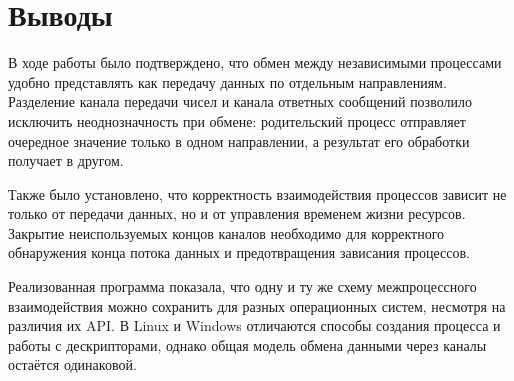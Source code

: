 \section{Выводы}
В ходе работы было подтверждено, что обмен между независимыми процессами удобно представлять как передачу данных по отдельным направлениям. Разделение канала передачи чисел и канала ответных сообщений позволило исключить неоднозначность при обмене: родительский процесс отправляет очередное значение только в одном направлении, а результат его обработки получает в другом.

Также было установлено, что корректность взаимодействия процессов зависит не только от передачи данных, но и от управления временем жизни ресурсов. Закрытие неиспользуемых концов каналов необходимо для корректного обнаружения конца потока данных и предотвращения зависания процессов.

Реализованная программа показала, что одну и ту же схему межпроцессного взаимодействия можно сохранить для разных операционных систем, несмотря на различия их API. В Linux и Windows отличаются способы создания процесса и работы с дескрипторами, однако общая модель обмена данными через каналы остаётся одинаковой.
\pagebreak
